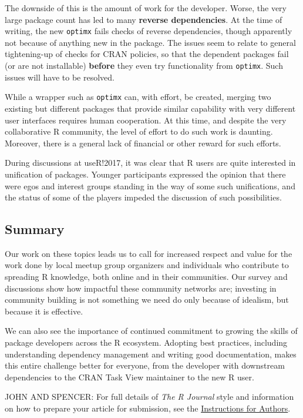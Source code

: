 The downside of this is the amount of work for the developer. Worse, the
very large package count has led to many \textbf{reverse dependencies}.
At the time of writing, the new \texttt{optimx} fails checks of reverse
dependencies, though apparently not because of anything new in the
package. The issues seem to relate to general tightening-up of checks
for CRAN policies, so that the dependent packages fail (or are not
installable) \textbf{before} they even try functionality from
\texttt{optimx}. Such issues will have to be resolved.

While a wrapper such as \texttt{optimx} can, with effort, be created,
merging two existing but different packages that provide similar
capability with very different user interfaces requires human
cooperation. At this time, and despite the very collaborative R
community, the level of effort to do such work is daunting. Moreover,
there is a general lack of financial or other reward for such efforts.

During discussions at useR!2017, it was clear that R users are quite
interested in unification of packages. Younger participants expressed
the opinion that there were egos and interest groups standing in the way
of some such unifications, and the status of some of the players impeded
the discussion of such possibilities.

\hypertarget{summary}{%
\subsection{Summary}\label{summary}}

Our work on these topics leads us to call for increased respect and
value for the work done by local meetup group organizers and individuals
who contribute to spreading R knowledge, both online and in their
communities. Our survey and discussions show how impactful these
community networks are; investing in community building is not something
we need do only because of idealism, but because it is effective.

We can also see the importance of continued commitment to growing the
skills of package developers across the R ecosystem. Adopting best
practices, including understanding dependency management and writing
good documentation, makes this entire challenge better for everyone,
from the developer with downstream dependencies to the CRAN Task View
maintainer to the new R user.

JOHN AND SPENCER: For full details of \emph{The R Journal} style and
information on how to prepare your article for submission, see the
\href{https://journal.r-project.org/share/author-guide.pdf}{Instructions
for Authors}.

